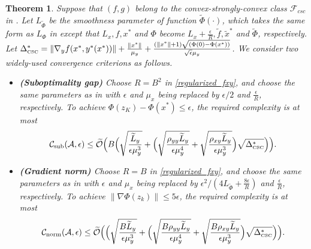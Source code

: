 \documentclass{osudissert96}
\newtheorem{theorem}{Theorem}
\begin{document}
\begin{theorem}\label{th:upper_csc1sc}
Suppose that $(f,g)$ belong to the convex-strongly-convex class $\mathcal{F}_{csc}$ in . Let $L_{\widetilde \Phi}$ be the smoothness parameter of function $\widetilde \Phi(\cdot)$, which takes the same form as $L_\Phi$ in  except that $L_x,f,x^*$ and $\Phi$ become $L_x+\frac{\epsilon}{R},\widetilde f,\widetilde x^*$ and $\widetilde \Phi$, respectively. Let  $\Delta^*_{\text{\normalfont\tiny CSC}} = \|\nabla_y f( x^*,y^*(x^*))\|+\frac{\|x^*\|}{\mu_y}+\frac{(\|x^*\|+1)\sqrt{(\Phi(0)-\Phi(x^*))}}{\sqrt{\epsilon}\mu_y}$.  We consider two widely-used convergence criterions as follows. 
\begin{itemize}
\item {\bf (Suboptimality gap)} Choose $R=B^2$ in \cref{regularized_fxy}, and choose the same parameters as in  with $\epsilon$ and $\mu_x$ being replaced by $\epsilon/2$ and $\frac{\epsilon}{R}$, respectively.
To achieve $\Phi(z_K) - \Phi(x^*)\leq \epsilon$, the required complexity is at most
 \begin{align*}
\mathcal{C}_{\text{\normalfont sub}}(\mathcal{A},\epsilon) \leq  \mathcal{\widetilde O}\Big( B\Big( \sqrt{\frac{\widetilde L_y}{\epsilon\mu_y^3}}+\Big(\sqrt{\frac{\rho_{yy}\widetilde L_y}{\epsilon\mu_y^{4}}} +  \sqrt{\frac{\rho_{xy}\widetilde L_y}{\epsilon\mu_y^3}}\Big)\sqrt{\Delta^*_{\text{\normalfont\tiny CSC}}}\Big)\Big).
\end{align*}
\item {\bf (Gradient norm)} Choose $R=B$ in \cref{regularized_fxy}, and choose the same parameters as in  with 
 $\epsilon$ and $\mu_x$ being replaced by $\epsilon^2/(4L_{\widetilde \Phi}+ \frac{8\epsilon}{R})$ and $\frac{\epsilon}{R}$, respectively. 
 To achieve $\|\nabla \Phi (z_k)\|\leq 5\epsilon$, the required complexity is at most 
  \begin{align*}
\mathcal{C}_{\text{\normalfont norm}}(\mathcal{A},\epsilon) \leq \mathcal{\widetilde O}\Big( \Big( \sqrt{\frac{B\widetilde L_y}{\epsilon\mu_y^3}}+\Big(\sqrt{\frac{B\rho_{yy}\widetilde L_y}{\epsilon\mu_y^{4}}} +  \sqrt{\frac{B\rho_{xy}\widetilde L_y}{\epsilon\mu_y^3}}\Big)\sqrt{\Delta^*_{\text{\normalfont\tiny CSC}}}\Big)\Big).
\end{align*}
\end{itemize}
\end{theorem}  
\end{document}
